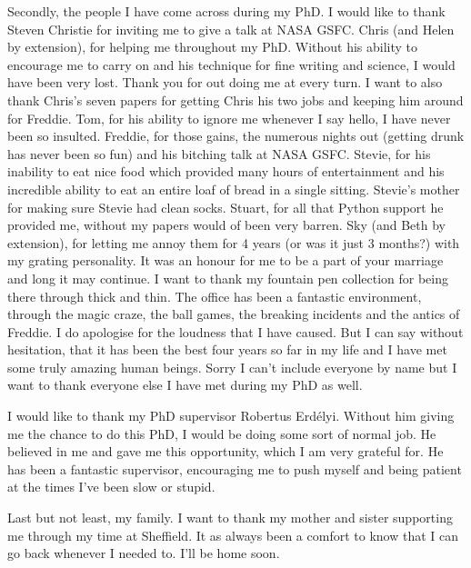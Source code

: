 \begin{acknowledgements}
    Secondly, the people I have come across during my PhD.
    I would like to thank Steven Christie for inviting me to give a talk at NASA GSFC.
    Chris (and Helen by extension), for helping me throughout my PhD.
    Without his ability to encourage me to carry on and his technique for fine writing and science, I would have been very lost.
    Thank you for out doing me at every turn.
    I want to also thank Chris's seven papers for getting Chris his two jobs and keeping him around for Freddie.
    Tom, for his ability to ignore me whenever I say hello, I have never been so insulted.
    Freddie, for those gains, the numerous nights out (getting drunk has never been so fun) and his bitching talk at NASA GSFC.
    Stevie, for his inability to eat nice food which provided many hours of entertainment and his incredible ability to eat an entire loaf of bread in a single sitting. 
    Stevie's mother for making sure Stevie had clean socks.
    Stuart, for all that Python support he provided me, without my papers would of been very barren.
    Sky (and Beth by extension), for letting me annoy them for 4 years (or was it just 3 months?) with my grating personality.
    It was an honour for me to be a part of your marriage and long it may continue.
    I want to thank my fountain pen collection for being there through thick and thin.
    The office has been a fantastic environment, through the magic craze, the ball games, the breaking incidents and the antics of Freddie. 
    I do apologise for the loudness that I have caused.
    But I can say without hesitation, that it has been the best four years so far in my life and I have met some truly amazing human beings.
    Sorry I can't include everyone by name but I want to thank everyone else I have met during my PhD as well.
        
    I would like to thank my PhD supervisor Robertus Erd\'elyi.
    Without him giving me the chance to do this PhD, I would be doing some sort of normal job.
    He believed in me and gave me this opportunity, which I am very grateful for.
    He has been a fantastic supervisor, encouraging me to push myself and being patient at the times I've been slow or stupid.
    
    Last but not least, my family.
    I want to thank my mother and sister supporting me through my time at Sheffield.
    It as always been a comfort to know that I can go back whenever I needed to.
    I'll be home soon.
    
\end{acknowledgements}